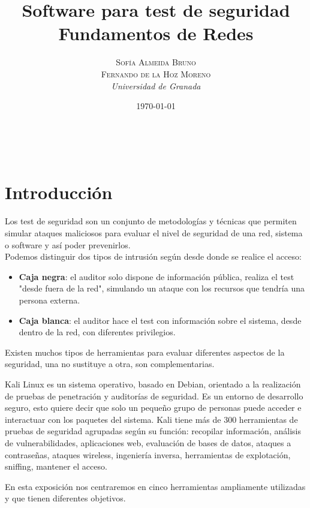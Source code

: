 \documentclass[a4paper, 11pt]{article}
\title{\textbf{Software para test de seguridad}\\ %
Fundamentos de Redes} %
\author{\textsc{Sofía Almeida Bruno\\Fernando de la Hoz Moreno} %
\\{\textit{Universidad de Granada}}} %
\date{\today} %
\makeatletter
\theoremstyle{plain}
\renewcommand{\maketitle}{
  \begin{flushright} %
  
  {\LARGE\@title} %
  
  \vspace{50pt} %
  
  {\large\@author} %
  \\\@date %
  \vspace{40pt} %
  \end{flushright}
}
\makeatother
\begin{document}
\maketitle %
\newpage
\tableofcontents
\newpage

\section{Introducción}

Los test de seguridad son un conjunto de metodologías y técnicas que permiten simular ataques maliciosos para evaluar el nivel de seguridad de una red, sistema o software y así poder prevenirlos.\\

Podemos distinguir dos tipos de intrusión según desde donde se realice el acceso:
\begin{itemize}
	\item \textbf{Caja negra}: el auditor solo dispone de información pública, realiza el test "desde fuera de la red", simulando un ataque con los recursos que tendría una persona externa.
		\item \textbf{Caja blanca}: el auditor hace el test con información sobre el sistema, desde dentro de la red, con diferentes privilegios.
\end{itemize}

Existen muchos tipos de herramientas para evaluar diferentes aspectos de la seguridad, una no sustituye a otra, son complementarias. 

Kali Linux es un sistema operativo, basado en Debian, orientado a la realización de pruebas de penetración y auditorías de seguridad. Es un entorno de desarrollo seguro, esto quiere decir que solo un pequeño grupo de personas puede acceder e interactuar con los paquetes del sistema. Kali tiene más de 300 herramientas de pruebas de seguridad agrupadas según su función: recopilar información, análisis de vulnerabilidades, aplicaciones web, evaluación de bases de datos, ataques a contraseñas, ataques wireless, ingeniería inversa, herramientas de explotación, sniffing, mantener el acceso.

En esta exposición nos centraremos en cinco herramientas ampliamente utilizadas y que tienen diferentes objetivos.
\end{document}
